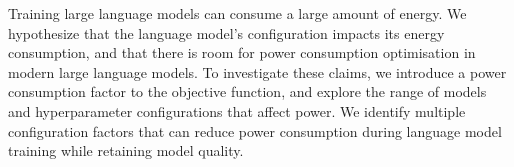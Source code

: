 Training large language models can consume a large amount of energy. We hypothesize that the language model's configuration impacts its energy consumption, and that there is room for power consumption optimisation in modern large language models. To investigate these claims, we introduce a power consumption factor to the objective function, and explore the range of models and hyperparameter configurations that affect power. We identify multiple configuration factors that can reduce power consumption during language model training while retaining model quality.
